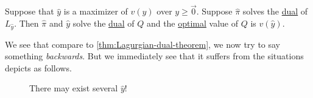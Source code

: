 \begin{theorem}\label{thm:converse-Lagrangian-dual-theorem}
	Suppose that \(\hat{y}\) is a maximizer of \(v(y)\) over \(y\geq \vec{0}\). Suppose \(\hat{\pi}\) solves the \hyperref[def:dual]{dual} of \(L_{\hat{y}}\).
	Then \(\hat{\pi}\) and \(\hat{y}\) solve the \hyperref[def:dual]{dual} of \(Q\) and the \hyperref[def:optimal-solution]{optimal} value of \(Q\) is \(v(\hat{y})\).
\end{theorem}
\begin{intuition}
	We see that compare to \autoref{thm:Lagurgian-dual-theorem}, we now try to say something \emph{backwards}. But we immediately see that it suffers from
	the situations depicts as follows.
	\begin{figure}[H]
		\centering
		\caption{There may exist several \(\hat{y} \)!}
		\label{fig:lagrangian-maximizer}
	\end{figure}
\end{intuition}